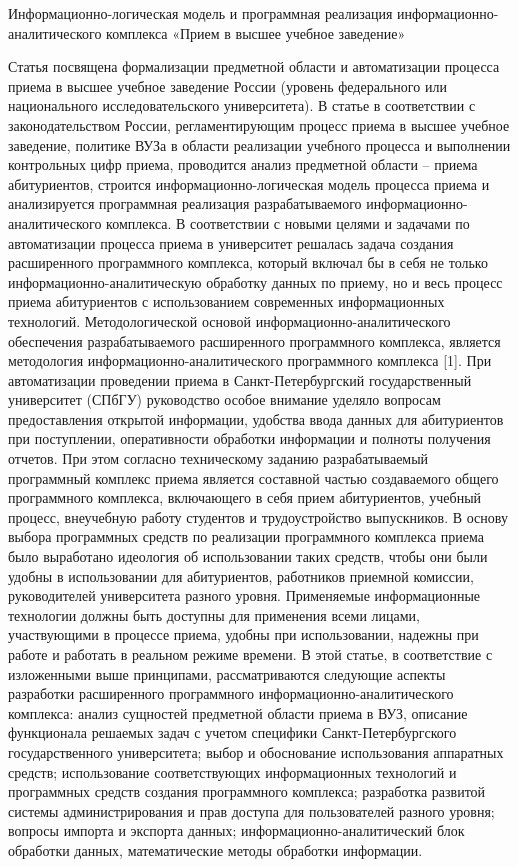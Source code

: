\documentclass[12pt]{article}
\begin{document}
Информационно-логическая модель и программная реализация  информационно-аналитического комплекса
 «Прием в высшее учебное заведение»

Статья посвящена формализации предметной области и автоматизации процесса приема в  высшее учебное заведение России (уровень федерального или национального исследовательского университета). В статье в соответствии с законодательством России, регламентирующим процесс приема в высшее учебное заведение, политике ВУЗа в области реализации учебного процесса и выполнении контрольных цифр приема, проводится анализ предметной области – приема абитуриентов, строится информационно-логическая модель процесса приема и анализируется программная реализация разрабатываемого информационно-аналитического комплекса.
 	В соответствии с новыми целями и задачами по автоматизации процесса приема в университет решалась задача создания расширенного программного комплекса, который включал бы в себя не только информационно-аналитическую обработку данных по приему, но и весь процесс приема абитуриентов с использованием современных информационных технологий.
Методологической основой информационно-аналитического обеспечения разрабатываемого  расширенного программного комплекса, является методология информационно-аналитического программного комплекса [1]. 
При автоматизации проведении приема в Санкт-Петербургский государственный университет (СПбГУ) руководство особое внимание уделяло вопросам предоставления открытой информации, удобства ввода данных для абитуриентов при поступлении, оперативности обработки информации и полноты получения отчетов. При этом согласно техническому заданию  разрабатываемый программный комплекс приема является составной частью создаваемого общего программного комплекса, включающего в себя прием абитуриентов, учебный процесс, внеучебную работу студентов и трудоустройство выпускников. 
В основу выбора программных средств по реализации программного комплекса приема было выработано идеология об использовании таких средств, чтобы они были удобны в использовании для абитуриентов, работников приемной комиссии, руководителей университета разного уровня. Применяемые информационные технологии должны быть доступны для применения всеми лицами, участвующими в процессе приема, удобны при использовании, надежны при работе и работать в реальном режиме времени. 
В этой статье, в соответствие с изложенными выше принципами, рассматриваются следующие аспекты разработки расширенного программного информационно-аналитического комплекса:
анализ сущностей предметной области приема в ВУЗ, описание  функционала решаемых задач с учетом специфики Санкт-Петербургского государственного университета;
выбор и обоснование использования аппаратных средств;
использование соответствующих информационных технологий и программных средств создания программного комплекса; 
разработка развитой системы администрирования и прав доступа для пользователей разного уровня;
вопросы импорта и экспорта данных;
информационно-аналитический блок обработки данных, математические методы обработки информации.
\end{document}
